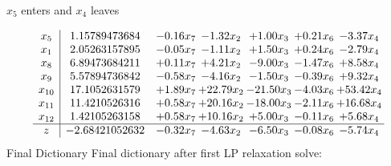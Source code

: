 \documentclass[8pt]{article}
\begin{document}
 $ x_{5} $ enters and $ x_{4} $ leaves 

 \[\begin{array}{c| c c@{\hskip 2pt} c@{\hskip 2pt} c@{\hskip 2pt} c@{\hskip 2pt} c@{\hskip 2pt} }
 x_{5}   &  1.15789473684 & -0.16 x_{7} & -1.32 x_{2} & +  1.00 x_{3} & +  0.21 x_{6} & -3.37 x_{4}\\
 x_{1}   &  2.05263157895 & -0.05 x_{7} & -1.11 x_{2} & +  1.50 x_{3} & +  0.24 x_{6} & -2.79 x_{4}\\
 x_{8}   &  6.89473684211 & +  0.11 x_{7} & +  4.21 x_{2} & -9.00 x_{3} & -1.47 x_{6} & +  8.58 x_{4}\\
 x_{9}   &  5.57894736842 & -0.58 x_{7} & -4.16 x_{2} & -1.50 x_{3} & -0.39 x_{6} & +  9.32 x_{4}\\
 x_{10}   &  17.1052631579 & +  1.89 x_{7} & + 22.79 x_{2} & -21.50 x_{3} & -4.03 x_{6} & + 53.42 x_{4}\\
 x_{11}   &  11.4210526316 & +  0.58 x_{7} & + 20.16 x_{2} & -18.00 x_{3} & -2.11 x_{6} & + 16.68 x_{4}\\
 x_{12}   &  1.42105263158 & +  0.58 x_{7} & + 10.16 x_{2} & +  5.00 x_{3} & -0.11 x_{6} & +  5.68 x_{4}\\
\hline
z    &  -2.68421052632 & -0.32 x_{7} & -4.63 x_{2} & -6.50 x_{3} & -0.08 x_{6} & -5.74 x_{4}\\
\end{array}\]
Final Dictionary
Final dictionary after first LP relaxation solve: 
\end{document}
